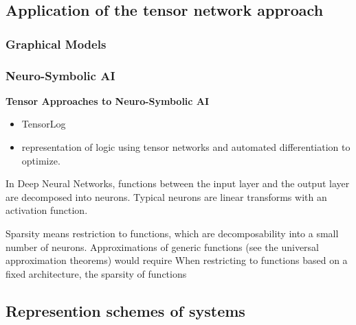 \subsection{Application of the tensor network approach}

\subsubsection{Graphical Models}


\subsubsection{Neuro-Symbolic AI}

\textbf{Tensor Approaches to Neuro-Symbolic AI}
\begin{itemize}
	\item TensorLog \cite{cohen_tensorlog_2020}
	\item \cite{badreddine_logic_2022} representation of logic using tensor networks and automated differentiation to optimize.
\end{itemize}

In Deep Neural Networks, functions between the input layer and the output layer are decomposed into neurons.
Typical neurons are linear transforms with an activation function.

Sparsity means restriction to functions, which are decomposability into a small number of neurons.
Approximations of generic functions (see the universal approximation theorems) would require 
When restricting to functions based on a fixed architecture, the sparsity of functions  





\subsection{Represention schemes of systems}




